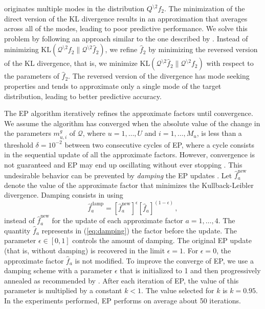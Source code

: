 \documentclass{article}
\begin{document}
originates multiple modes in the distribution $Q^{\setminus 2}f_2$.
The minimization of the direct version of the KL divergence results in an approximation that averages across all
of the modes, leading to poor predictive performance.
We solve this problem by following an approach similar to the one described by \cite{stern2009}.
Instead of minimizing $\text{KL}(\mathcal{Q}^{\setminus 2} f_2 \| \mathcal{Q}^{\setminus 2} \hat{f}_2)$,
we refine $\hat{f}_2$ by minimizing the reversed version of the KL divergence, that is,
we minimize $\text{KL}(\mathcal{Q}^{\setminus 2} \hat{f}_2 \| \mathcal{Q}^{\setminus 2} f_2)$ with respect to the parameters of $\hat{f}_2$.
The reversed version of the divergence has mode seeking properties \citep{Bishop2007} and tends to approximate
only a single mode of the target distribution, leading to better predictive accuracy.

The EP algorithm iteratively refines the approximate factors until convergence.
We assume the algorithm has converged when the absolute value of the change in the parameters
$m_{u,i}^g$ of $\mathcal{Q}$, where $u = 1,\ldots,U$ and $i = 1,\ldots,M_u$,
is less than a threshold $\delta = 10^{-2}$ between two consecutive cycles of EP,
where a cycle consists in the sequential update of all the approximate factors.
However, convergence is not guaranteed and
EP may end up oscillating without ever stopping \citep{Minka2001}.
This undesirable behavior can be prevented by \emph{damping} the EP updates \citep{Minka2002}.
Let $\hat{f}_a^\text{new}$ denote the value of the approximate factor that minimizes the Kullback-Leibler
divergence. Damping consists in using
\begin{equation}
\hat{f}_a^\text{damp} = \left[ \hat{f}_a^\text{new} \right]^\epsilon \left[ \hat{f}_a \right]^{(1 - \epsilon)}\,,\label{eq:damping}
\end{equation}
instead of $\hat{f}_a^\text{new}$ for the update of each approximate factor $a = 1,\ldots,4$.
The quantity $\hat{f}_a$ represents in (\ref{eq:damping})
the factor before the update. The parameter
$\epsilon \in [0,1]$ controls the amount of damping.
The original EP update (that is, without damping)
is recovered in the limit $\epsilon = 1$. For $\epsilon = 0$,
the approximate factor $\hat{f}_a$ is not modified.
To improve the converge of EP, we use a damping scheme
with a parameter $\epsilon$ that is initialized to 1
and then progressively annealed as recommended by \cite{HernandezLobato2010}.
After each iteration of EP, the value of
this parameter is multiplied by a constant $k < 1$.
The value selected for $k$ is $k = 0.95$.
In the experiments performed, EP performs on average about 50 iterations.
\end{document}
